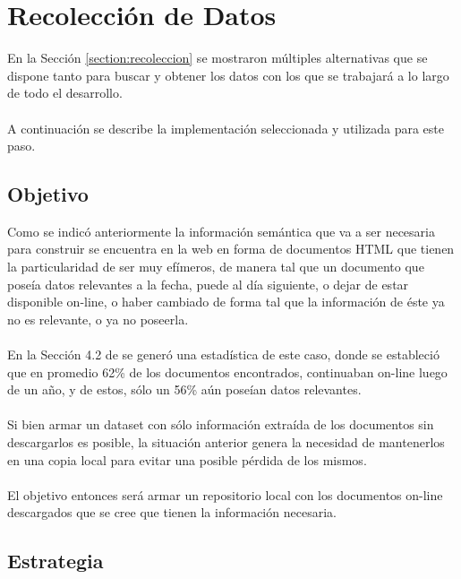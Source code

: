 \chapter{Recolección de Datos}
\label{chapter:recoleccion}

En la Sección \ref{section:recoleccion} se mostraron múltiples alternativas que se dispone 
tanto para buscar y obtener los datos con los que se trabajará a lo largo de todo el desarrollo.
\\\\
A continuación se describe la implementación seleccionada y utilizada para este paso.

\section{Objetivo}
\label{section:recoleccion-objetivo}

\noindent Como se indicó anteriormente la información semántica que va a ser necesaria para construir se encuentra en la web en forma de documentos 
HTML que tienen la particularidad de ser muy efímeros, de manera tal que un documento que poseía datos relevantes a la fecha,
puede al día siguiente, o dejar de estar disponible on-line, o haber cambiado de forma tal que la información de éste ya no es 
relevante, o ya no poseerla. 
\\\\
En la Sección 4.2 de \cite{Mendoza2014} se generó una estadística de este caso, donde se estableció que 
en promedio 62\% de los documentos encontrados, continuaban on-line luego de un año, y de estos, sólo un 56\% aún poseían 
datos relevantes. 
\\\\
Si bien armar un dataset con sólo información extraída de los documentos sin descargarlos es posible, la situación anterior 
genera la necesidad de mantenerlos en una copia local para evitar una posible pérdida de los mismos. 
\\\\
El objetivo entonces será armar un repositorio local con los documentos on-line descargados que se cree que tienen la información 
necesaria. 

 
\section{Estrategia}
\label{section:recoleccion-estrategia}

